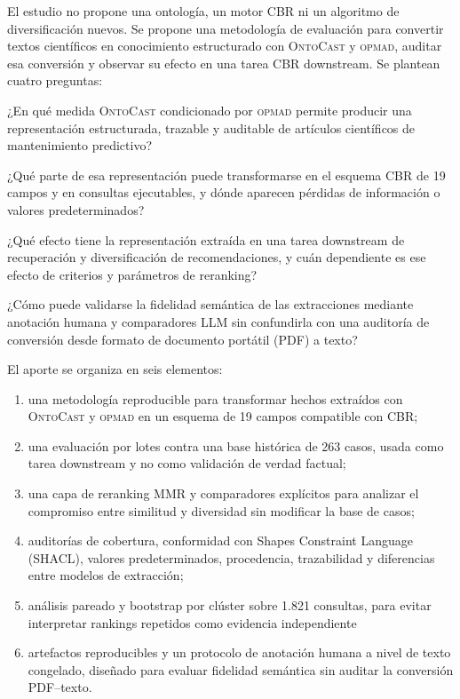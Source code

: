 \documentclass[11pt,a4paper]{article}
\newcommand{\OPMAD}{\textsc{opmad}}
\newcommand{\OntoCast}{\textsc{OntoCast}}
\begin{document}
El estudio no propone una ontología, un motor CBR ni un algoritmo de diversificación nuevos. Se propone una metodología de evaluación para convertir textos científicos en conocimiento estructurado con \OntoCast{} y \OPMAD{}, auditar esa conversión y observar su efecto en una tarea CBR downstream. Se plantean cuatro preguntas:

\begin{description}[style=nextline,leftmargin=1.5cm,labelwidth=1.2cm]
  \item[P1.] ¿En qué medida \OntoCast{} condicionado por \OPMAD{} permite producir una representación estructurada, trazable y auditable de artículos científicos de mantenimiento predictivo?
  \item[P2.] ¿Qué parte de esa representación puede transformarse en el esquema CBR de 19 campos y en consultas ejecutables, y dónde aparecen pérdidas de información o valores predeterminados?
  \item[P3.] ¿Qué efecto tiene la representación extraída en una tarea downstream de recuperación y diversificación de recomendaciones, y cuán dependiente es ese efecto de criterios y parámetros de reranking?
  \item[P4.] ¿Cómo puede validarse la fidelidad semántica de las extracciones mediante anotación humana y comparadores LLM sin confundirla con una auditoría de conversión desde formato de documento portátil (PDF) a texto?
\end{description}

El aporte se organiza en seis elementos:

\begin{enumerate}[label=(\roman*)]
  \item una metodología reproducible para transformar hechos extraídos con \OntoCast{} y \OPMAD{} en un esquema de 19 campos compatible con CBR;
  \item una evaluación por lotes contra una base histórica de 263 casos, usada como tarea downstream y no como validación de verdad factual;
  \item una capa de reranking MMR y comparadores explícitos para analizar el compromiso entre similitud y diversidad sin modificar la base de casos;
  \item auditorías de cobertura, conformidad con Shapes Constraint Language (SHACL), valores predeterminados, procedencia, trazabilidad y diferencias entre modelos de extracción;
  \item análisis pareado y bootstrap por clúster sobre 1.821 consultas, para evitar interpretar rankings repetidos como evidencia independiente
  \item artefactos reproducibles y un protocolo de anotación humana a nivel de texto congelado, diseñado para evaluar fidelidad semántica sin auditar la conversión PDF--texto.
\end{enumerate}
\end{document}
